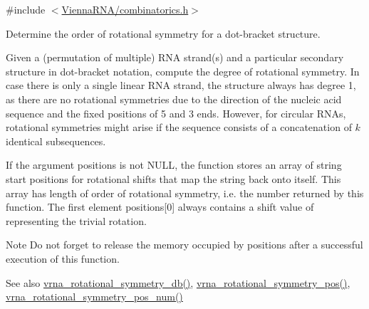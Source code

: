 {\ttfamily \#include $<$\mbox{\hyperlink{combinatorics_8h}{Vienna\+R\+N\+A/combinatorics.\+h}}$>$}



Determine the order of rotational symmetry for a dot-\/bracket structure. 

Given a (permutation of multiple) R\+NA strand(s) and a particular secondary structure in dot-\/bracket notation, compute the degree of rotational symmetry. In case there is only a single linear R\+NA strand, the structure always has degree 1, as there are no rotational symmetries due to the direction of the nucleic acid sequence and the fixed positions of 5\textquotesingle{} and 3\textquotesingle{} ends. However, for circular R\+N\+As, rotational symmetries might arise if the sequence consists of a concatenation of $k$ identical subsequences.

If the argument {\ttfamily positions} is not {\ttfamily N\+U\+LL}, the function stores an array of string start positions for rotational shifts that map the string back onto itself. This array has length of order of rotational symmetry, i.\+e. the number returned by this function. The first element {\ttfamily positions}\mbox{[}0\mbox{]} always contains a shift value of {} representing the trivial rotation.

\begin{DoxyNote}{Note}
Do not forget to release the memory occupied by {\ttfamily positions} after a successful execution of this function.
\end{DoxyNote}
\begin{DoxySeeAlso}{See also}
\mbox{\hyperlink{group__combinatorics__utils_gad42ffd53025bed9d636d811748db7c5a}{vrna\+\_\+rotational\+\_\+symmetry\+\_\+db()}}, \mbox{\hyperlink{group__combinatorics__utils_ga294d48935fcac87ab335d771fe289ecb}{vrna\+\_\+rotational\+\_\+symmetry\+\_\+pos()}}, \mbox{\hyperlink{group__combinatorics__utils_ga95b5a6ac35da982e2a766f8d2f98a2e1}{vrna\+\_\+rotational\+\_\+symmetry\+\_\+pos\+\_\+num()}}
\end{DoxySeeAlso}

